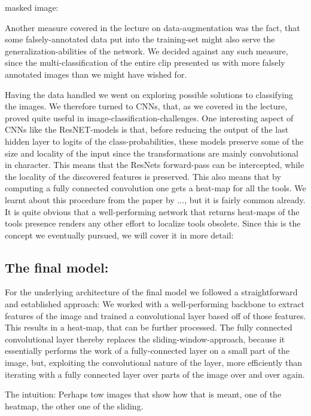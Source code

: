 masked image:

Another measure covered in the lecture on data-augmentation was the fact, that some falsely-annotated data put into the training-set might also serve the generalization-abilities of the network. We decided against any such measure, since the multi-classification of the entire clip presented us with more falsely annotated images than we might have wished for.

Having the data handled we went on exploring possible solutions to classifying the images. We therefore turned to CNNs, that, as we covered in the lecture, proved quite useful in image-classification-challenges. One interesting aspect of CNNs like the ResNET-models is that, before reducing the output of the last hidden layer to logits of the class-probabilities, these models preserve some of the size and locality of the input since the transformations are mainly convolutional in character. This means that the ResNets forward-pass can be intercepted, while the locality of the discovered features is preserved.
This also means that by computing a fully connected convolution one gets a heat-map for all the tools. We learnt about this procedure from the paper by ..., but it is fairly common already. It is quite obvious that a well-performing network that returns heat-maps of the tools presence renders any other effort to localize tools obsolete. Since this is the concept we eventually pursued, we will cover it in more detail:

\subsection{The final model:}
For the underlying architecture of the final model we followed a straightforward and established approach: We worked with a well-performing backbone to extract features of the image and trained a convolutional layer based off of those features. This results in a heat-map, that can be further processed.
The fully connected convolutional layer thereby replaces the sliding-window-approach, because it essentially performs the work of a fully-connected layer on a small part of the image, but, exploiting the convolutional nature of the layer, more efficiently than iterating with a fully connected layer over parts of the image over and over again. 

The intuition: Perhaps tow images that show how that is meant, one of the heatmap, the other one of the sliding.

